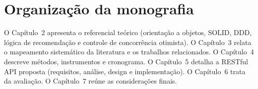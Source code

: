 \section{Organização da monografia}

O Capítulo~2 apresenta o referencial teórico (orientação a objetos, SOLID, DDD, lógica de recomendação e controle de concorrência otimista). O Capítulo~3 relata o mapeamento sistemático da literatura e os trabalhos relacionados. O Capítulo~4 descreve métodos, instrumentos e cronograma. O Capítulo~5 detalha a RESTful API proposta (requisitos, análise, design e implementação). O Capítulo~6 trata da avaliação. O Capítulo~7 reúne as considerações finais.